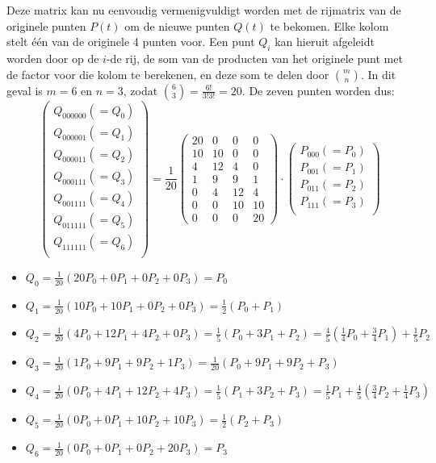 \begin{itemize}
{\begin{itemize}
			Deze matrix kan nu eenvoudig vermenigvuldigt worden met de rijmatrix van de originele punten $P(t)$ om de nieuwe punten $Q(t)$ te bekomen. Elke kolom stelt één van de originele 4 punten voor. Een punt $Q_i$ kan hieruit afgeleidt worden door op de $i$-de rij, de som van 
			de producten van het originele punt met de factor voor die kolom te berekenen, en deze som te delen door $\binom{m}{n}$. In dit geval is $m = 6$ en $n = 3$, zodat $\binom{6}{3} = \frac{6!}{3! 3!} = 20$. De zeven punten worden dus:
			$$
			\begin{pmatrix}
				Q_{000000} (=Q_0) \\
				Q_{000001} (=Q_1)\\
				Q_{000011} (=Q_2)\\
				Q_{000111} (=Q_3)\\
				Q_{001111} (=Q_4)\\
				Q_{011111} (=Q_5)\\
				Q_{111111} (=Q_6)\\
			\end{pmatrix}
			= 
			\frac{1}{20}
			\begin{pmatrix}
				20 & 0  & 0  & 0  \\ 
				10 & 10 & 0  & 0  \\ 
				4  & 12 & 4  & 0  \\ 
				1  & 9  & 9  & 1  \\ 
				0  & 4  & 12 & 4  \\ 
				0  & 0  & 10 & 10 \\ 
				0  & 0  & 0  & 20 
			\end{pmatrix}
			\cdot 
			\begin{pmatrix}
				P_{000} (=P_0)\\
				P_{001} (=P_1)\\
				P_{011} (=P_2)\\
				P_{111} (=P_3)\\
			\end{pmatrix}
			$$
			\begin{itemize}
				\item $Q_0 = \frac{1}{20} (20P_0 + 0P_1  + 0P_2  + 0P_3) = P_0$
				\item $Q_1 = \frac{1}{20}(10P_0 + 10P_1 + 0P_2  + 0P_3) = \frac{1}{2}(P_0 + P_1)$ 
				\item $Q_2 = \frac{1}{20}(4P_0  + 12P_1 + 4P_2  + 0P_3) = \frac{1}{5}(P_0  + 3P_1 + P_2) = \frac{4}{5}(\frac{1}{4}P_0 + \frac{3}{4}P_1) + \frac{1}{5}P_2$
				\item $Q_3 = \frac{1}{20}(1P_0  + 9P_1 + 9P_2  + 1P_3) = \frac{1}{20}(P_0 + 9P_1  + 9P_2 + P_3)$
				\item $Q_4 = \frac{1}{20}(0P_0  + 4P_1 + 12P_2  + 4P_3) = \frac{1}{5}(P_1  + 3P_2 + P_3) = \frac{1}{5}P_1 + \frac{4}{5}(\frac{3}{4}P_2 + \frac{1}{4}P_3) $
				\item $Q_5 = \frac{1}{20}(0P_0  + 0P_1 + 10P_2  + 10P_3) = \frac{1}{2}(P_2 + P_3)$
				\item $Q_6 = \frac{1}{20}(0P_0  + 0P_1 + 0P_2  + 20P_3) = P_3$
			\end{itemize}
			

\end{itemize}}
\end{itemize}
